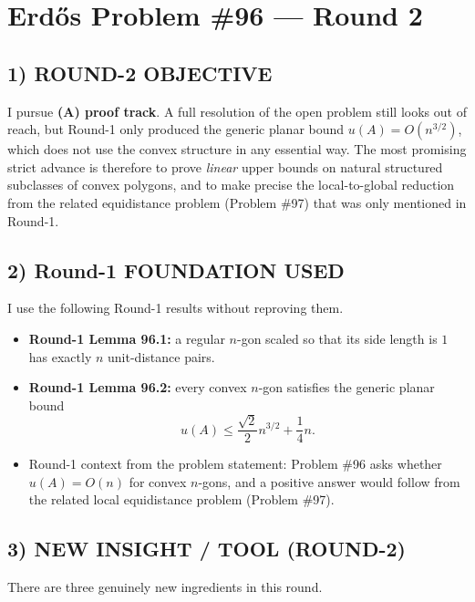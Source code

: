 \section{Erdős Problem \#96 --- Round 2}

\subsection*{1) ROUND-2 OBJECTIVE}

I pursue \textbf{(A) proof track}. A full resolution of the open problem still looks out of reach, but Round-1 only produced the generic planar bound $u(A)=O(n^{3/2})$, which does not use the convex structure in any essential way. The most promising strict advance is therefore to prove \emph{linear} upper bounds on natural structured subclasses of convex polygons, and to make precise the local-to-global reduction from the related equidistance problem (Problem \#97) that was only mentioned in Round-1.

\subsection*{2) Round-1 FOUNDATION USED}

I use the following Round-1 results without reproving them.

\begin{itemize}
\item \textbf{Round-1 Lemma 96.1:} a regular $n$-gon scaled so that its side length is $1$ has exactly $n$ unit-distance pairs.
\item \textbf{Round-1 Lemma 96.2:} every convex $n$-gon satisfies the generic planar bound
\[
  u(A)\le \frac{\sqrt 2}{2}n^{3/2}+\frac14 n.
\]
\item Round-1 context from the problem statement: Problem \#96 asks whether $u(A)=O(n)$ for convex $n$-gons, and a positive answer would follow from the related local equidistance problem (Problem \#97).
\end{itemize}

\subsection*{3) NEW INSIGHT / TOOL (ROUND-2)}

There are three genuinely new ingredients in this round.


